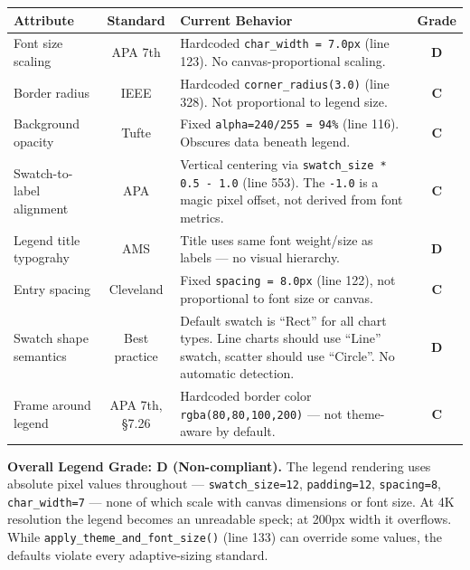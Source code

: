 \documentclass[11pt,a4paper]{article}
\begin{document}
\begin{longtable}{p{3.5cm} c p{6cm} c}
\toprule
\textbf{Attribute} & \textbf{Standard} & \textbf{Current Behavior} & \textbf{Grade} \\
\midrule
Font size scaling & APA 7th & Hardcoded \texttt{char\_width = 7.0px}
  (line 123). No canvas-proportional scaling. & \textcolor{googred}{\textbf{D}} \\[6pt]

Border radius & IEEE & Hardcoded \texttt{corner\_radius(3.0)}
  (line 328). Not proportional to legend size. & \textcolor{warningyellow}{\textbf{C}} \\[6pt]

Background opacity & Tufte & Fixed \texttt{alpha=240/255 = 94\%}
  (line 116). Obscures data beneath legend. & \textcolor{warningyellow}{\textbf{C}} \\[6pt]

Swatch-to-label alignment & APA & Vertical centering via \texttt{swatch\_size * 0.5 - 1.0}
  (line 553). The \texttt{-1.0} is a magic pixel offset, not derived from
  font metrics. & \textcolor{warningyellow}{\textbf{C}} \\[6pt]

Legend title typograhy & AMS & Title uses same font weight/size
  as labels — no visual hierarchy. & \textcolor{googred}{\textbf{D}} \\[6pt]

Entry spacing & Cleveland & Fixed \texttt{spacing = 8.0px} (line 122),
  not proportional to font size or canvas. & \textcolor{warningyellow}{\textbf{C}} \\[6pt]

Swatch shape semantics & Best practice & Default swatch is ``Rect'' for
  all chart types. Line charts should use ``Line'' swatch, scatter should
  use ``Circle''. No automatic detection. & \textcolor{googred}{\textbf{D}} \\[6pt]

Frame around legend & APA 7th, §7.26 & Hardcoded border color
  \texttt{rgba(80,80,100,200)} — not theme-aware by default. & \textcolor{warningyellow}{\textbf{C}} \\
\bottomrule
\end{longtable}

\begin{warningbox}
\textbf{Overall Legend Grade: D (Non-compliant).}
The legend rendering uses absolute pixel values throughout — \texttt{swatch\_size=12},
\texttt{padding=12}, \texttt{spacing=8}, \texttt{char\_width=7} — none of which
scale with canvas dimensions or font size. At 4K resolution the legend becomes
an unreadable speck; at 200px width it overflows. While
\texttt{apply\_theme\_and\_font\_size()} (line 133) can override some values,
the defaults violate every adaptive-sizing standard.
\end{warningbox}
\end{document}
